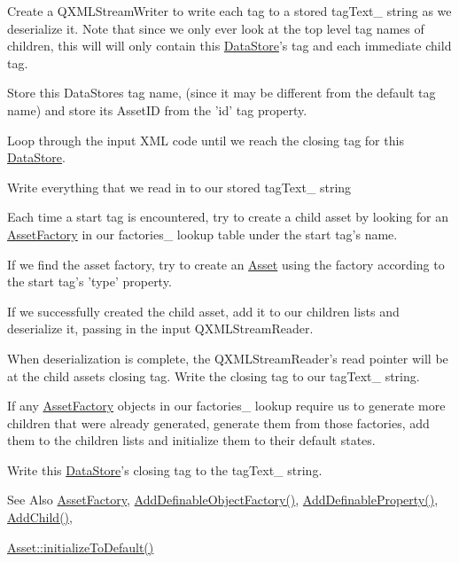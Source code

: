 \begin{DoxyEnumerate}
\item Create a Q\-X\-M\-L\-Stream\-Writer to write each tag to a stored tag\-Text\-\_\- string as we deserialize it. Note that since we only ever look at the top level tag names of children, this will will only contain this \hyperlink{class_picto_1_1_data_store}{Data\-Store}'s tag and each immediate child tag.
\item Store this Data\-Stores tag name, (since it may be different from the default tag name) and store its Asset\-I\-D from the 'id' tag property.
\item Loop through the input X\-M\-L code until we reach the closing tag for this \hyperlink{class_picto_1_1_data_store}{Data\-Store}.
\begin{DoxyItemize}
\item Write everything that we read in to our stored tag\-Text\-\_\- string
\item Each time a start tag is encountered, try to create a child asset by looking for an \hyperlink{class_picto_1_1_asset_factory}{Asset\-Factory} in our factories\-\_\- lookup table under the start tag's name.
\item If we find the asset factory, try to create an \hyperlink{class_picto_1_1_asset}{Asset} using the factory according to the start tag's 'type' property.
\item If we successfully created the child asset, add it to our children lists and deserialize it, passing in the input Q\-X\-M\-L\-Stream\-Reader.
\item When deserialization is complete, the Q\-X\-M\-L\-Stream\-Reader's read pointer will be at the child assets closing tag. Write the closing tag to our tag\-Text\-\_\- string.
\end{DoxyItemize}
\item If any \hyperlink{class_picto_1_1_asset_factory}{Asset\-Factory} objects in our factories\-\_\- lookup require us to generate more children that were already generated, generate them from those factories, add them to the children lists and initialize them to their default states.
\item Write this \hyperlink{class_picto_1_1_data_store}{Data\-Store}'s closing tag to the tag\-Text\-\_\- string. \begin{DoxySeeAlso}{See Also}
\hyperlink{class_picto_1_1_asset_factory}{Asset\-Factory}, \hyperlink{class_picto_1_1_data_store_a8a1c8ece2f1cbc05471ecff11e050ddb}{Add\-Definable\-Object\-Factory()}, \hyperlink{class_picto_1_1_data_store_aa26b8b2191fa50b0f963b1d94a6e3407}{Add\-Definable\-Property()}, \hyperlink{class_picto_1_1_data_store_a6a6e68d0e50d9c4d3cf0dee3f30c34fa}{Add\-Child()}, 

\hyperlink{class_picto_1_1_asset_ae39fd27817fd498d9e197b77bb942fe3}{Asset\-::initialize\-To\-Default()} 
\end{DoxySeeAlso}

\end{DoxyEnumerate}

